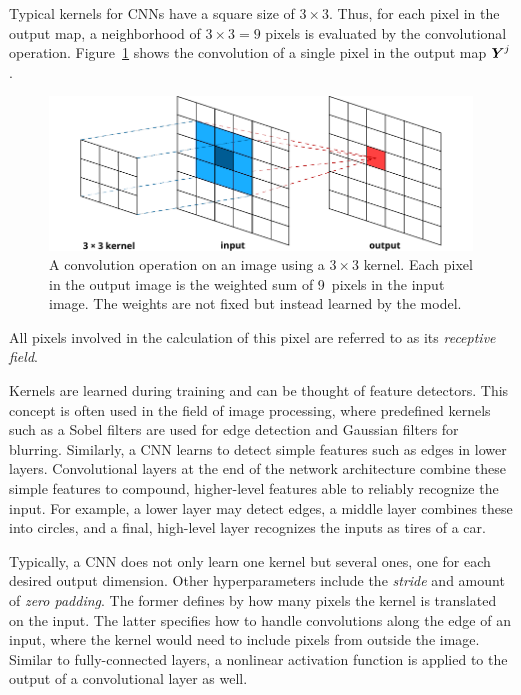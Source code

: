 Typical kernels for CNNs have a square size of $3 \times 3$. Thus, for each pixel in the output map, a neighborhood of $3 \times 3 = 9$ pixels is evaluated by the convolutional operation.  Figure~\ref{fig:convolution} shows the convolution of a single pixel in the output map $\boldsymbol{Y}^{j}$.
	\begin{figure}[tp]
  		\centering
    	\includegraphics{img/convolution.pdf}
    	\caption{A convolution operation on an image using a $3 \times 3$ kernel. Each pixel in the output image is the weighted sum of \num{9}~pixels in the input image. The weights are not fixed but instead learned by the model.}
    	\label{fig:convolution}
	\end{figure}
	All pixels involved in the calculation of this pixel are referred to as its \emph{receptive field}. 

Kernels are learned during training and can be thought of feature detectors. This concept is often used in the field of image processing, where predefined kernels such as a Sobel filters are used for edge detection and Gaussian filters for blurring. Similarly, a CNN learns to detect simple features such as edges in lower layers. Convolutional layers at the end of the network architecture combine these simple features to compound, higher-level features able to reliably recognize the input. For example, a lower layer may detect edges, a middle layer combines these into circles, and a final, high-level layer recognizes the inputs as tires of a car.

Typically, a CNN does not only learn one kernel but several ones, one for each desired output dimension. Other hyperparameters include the \emph{stride} and amount of \emph{zero padding}. The former defines by how many pixels the kernel is translated on the input. The latter specifies how to handle convolutions along the edge of an input, where the kernel would need to include pixels from outside the image. Similar to fully-connected layers, a nonlinear activation function is applied to the output of a convolutional layer as well.  

